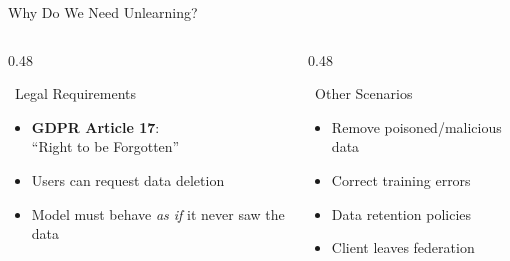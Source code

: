 \documentclass[aspectratio=169, 11pt]{beamer}
\begin{document}
\begin{frame}{Why Do We Need Unlearning?}
    \begin{columns}[T]
        \begin{column}{0.48\textwidth}
            \begin{block}{\faGavel\ Legal Requirements}
                \begin{itemize}
                    \item \textbf{GDPR Article 17}:\\``Right to be Forgotten''
                    \item Users can request data deletion
                    \item Model must behave \textit{as if} it never saw the data
                \end{itemize}
            \end{block}
        \end{column}
        
        \begin{column}{0.48\textwidth}
            \begin{block}{\faBug\ Other Scenarios}
                \begin{itemize}
                    \item Remove poisoned/malicious data
                    \item Correct training errors
                    \item Data retention policies
                    \item Client leaves federation
                \end{itemize}
            \end{block}
        \end{column}
    \end{columns}
\end{frame}
\end{document}

